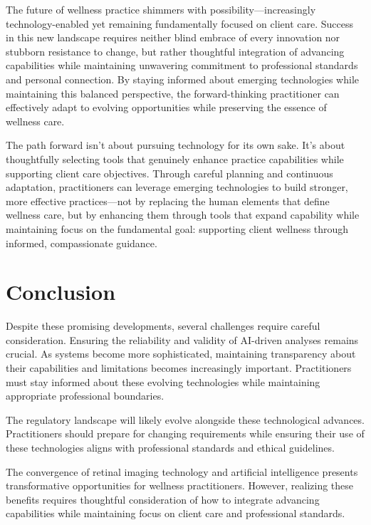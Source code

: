 \documentclass[
  Letterpaper,
]{scrbook}
\begin{document}
The future of wellness practice shimmers with possibility---increasingly
technology-enabled yet remaining fundamentally focused on client care.
Success in this new landscape requires neither blind embrace of every
innovation nor stubborn resistance to change, but rather thoughtful
integration of advancing capabilities while maintaining unwavering
commitment to professional standards and personal connection. By staying
informed about emerging technologies while maintaining this balanced
perspective, the forward-thinking practitioner can effectively adapt to
evolving opportunities while preserving the essence of wellness care.

The path forward isn't about pursuing technology for its own sake. It's
about thoughtfully selecting tools that genuinely enhance practice
capabilities while supporting client care objectives. Through careful
planning and continuous adaptation, practitioners can leverage emerging
technologies to build stronger, more effective practices---not by
replacing the human elements that define wellness care, but by enhancing
them through tools that expand capability while maintaining focus on the
fundamental goal: supporting client wellness through informed,
compassionate guidance.

\section{Conclusion}\label{conclusion-3}

Despite these promising developments, several challenges require careful
consideration. Ensuring the reliability and validity of AI-driven
analyses remains crucial. As systems become more sophisticated,
maintaining transparency about their capabilities and limitations
becomes increasingly important. Practitioners must stay informed about
these evolving technologies while maintaining appropriate professional
boundaries.

The regulatory landscape will likely evolve alongside these
technological advances. Practitioners should prepare for changing
requirements while ensuring their use of these technologies aligns with
professional standards and ethical guidelines.

The convergence of retinal imaging technology and artificial
intelligence presents transformative opportunities for wellness
practitioners. However, realizing these benefits requires thoughtful
consideration of how to integrate advancing capabilities while
maintaining focus on client care and professional standards.
\end{document}
